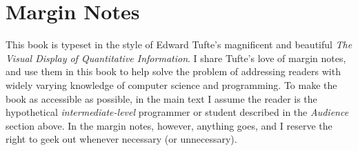 












\section{Margin Notes}\label{sec:preface:margin-notes}

This book is typeset in the style of Edward Tufte's
magnificent and beautiful \emph{The Visual Display of
  Quantitative Information}\cite{Tufte:1986:VDQ:33404}.  I share
Tufte's love of margin notes, and use them in this book to help solve the problem of addressing readers with
widely varying knowledge of computer science and programming.
%
To make the book as accessible as possible, in the main text I assume
the reader is the hypothetical \emph{intermediate-level} programmer or
student described in the \emph{Audience} section above.
%
In the margin notes, however, anything goes, and I reserve the right
to geek out whenever necessary (or unnecessary).


